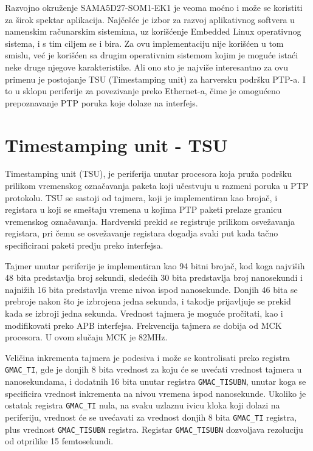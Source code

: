 \documentclass[a4paper,12pt, master]{etf}
\begin{document}
	Razvojno okru\v{z}enje SAMA5D27-SOM1-EK1 je veoma mo\'{c}no i mo\v{z}e se
	koristiti za \v{s}irok spektar aplikacija. Naj\v{c}e\v{s}\'{c}e je izbor za
	razvoj aplikativnog softvera u namenskim ra\v{c}unarskim sistemima, uz
	kori\v{s}\'{c}enje Embedded Linux operativnog sistema, i s tim ciljem se i
	bira. Za ovu implementaciju nije kori\v{s}\'{c}en u tom smislu,	ve\'{c} je
	kori\v{s}\'{c}en sa drugim operativnim sistemom kojim je mogu\'{c}e
	ista\'{c}i neke druge njegove karakteristike. Ali ono sto je najvi\v{s}e
	interesantno za ovu primenu je postojanje TSU (Timestamping unit) za
	harversku podr\v{s}ku PTP-a. I to u sklopu periferije za povezivanje preko
	Ethernet-a, \v{c}ime je omogu\'{c}eno prepoznavanje PTP poruka koje dolaze
	na interfejs.

	\section{Timestamping unit - TSU}
	Timestamping unit (TSU), je periferija unutar procesora koja pru\v{z}a
	podr\v{s}ku prilikom vremenskog ozna\v{c}avanja paketa koji u\v{c}estvuju u
	razmeni poruka u PTP protokolu. TSU se sastoji od tajmera, koji je
	implementiran kao broja\v{c}, i registara u koji se sme\v{s}taju vremena u
	kojima PTP paketi prelaze granicu vremenskog ozna\v{c}avanja. Hardverski
	prekid se registruje prilikom osve\v{z}avanja registara, pri \v{c}emu se
	osve\v{z}avanje registara dogadja svaki put kada ta\v{c}no specificirani
	paketi predju preko interfejsa.

	Tajmer unutar periferije je implementiran kao 94 bitni broja\v{c}, kod koga
	najvi\v{s}ih 48 bita predstavlja broj sekundi, slede\'{c}ih 30 bita predstavlja
    broj nanosekundi i najni\v{z}ih 16 bita predstavlja vreme nivoa ispod
    nanosekunde. Donjih 46 bita se prebroje nakon \v{s}to je izbrojena jedna
    sekunda, i takodje prijavljuje se prekid kada se izbroji jedna sekunda.
    Vrednost tajmera je mogu\'{c}e pro\v{c}itati, kao i modifikovati preko APB
    interfejsa. Frekvencija tajmera se dobija od MCK procesora. U ovom
    slu\v{c}aju MCK je 82MHz.

	Veli\v{c}ina inkrementa tajmera je podesiva i mo\v{z}e se kontrolisati
	preko registra \verb|GMAC_TI|, gde je donjih 8 bita vrednost za koju \'{c}e se
	uve\'{c}ati vrednost tajmera u nanosekundama, i dodatnih 16 bita unutar
	registra \verb|GMAC_TISUBN|, unutar koga se specificira vrednost inkrementa na
    nivou vremena ispod nanosekunde. Ukoliko je ostatak registra \verb|GMAC_TI|
    nula, na svaku uzlaznu ivicu kloka koji dolazi na periferiju, vrednost
    \'{c}e se uve\'{c}avati za vrednost donjih 8 bita \verb|GMAC_TI| registra,
    plus vrednost \verb|GMAC_TISUBN| registra. Registar \verb|GMAC_TISUBN|
    dozvoljava rezoluciju od otprilike 15 femtosekundi.
\end{document}
